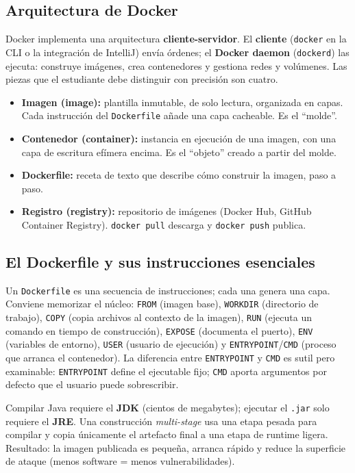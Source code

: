 \documentclass[11pt,a4paper]{article}
\begin{document}
\subsection{Arquitectura de Docker}

Docker implementa una arquitectura \textbf{cliente-servidor}. El \textbf{cliente} (\texttt{docker} en la CLI o la integraci\'on de IntelliJ) env\'ia \'ordenes; el \textbf{Docker daemon} (\texttt{dockerd}) las ejecuta: construye im\'agenes, crea contenedores y gestiona redes y vol\'umenes. Las piezas que el estudiante debe distinguir con precisi\'on son cuatro.

\begin{itemize}
\item \textbf{Imagen (image):} plantilla inmutable, de solo lectura, organizada en capas. Cada instrucci\'on del \texttt{Dockerfile} a\~nade una capa cacheable. Es el ``molde''.
\item \textbf{Contenedor (container):} instancia en ejecuci\'on de una imagen, con una capa de escritura ef\'imera encima. Es el ``objeto'' creado a partir del molde.
\item \textbf{Dockerfile:} receta de texto que describe c\'omo construir la imagen, paso a paso.
\item \textbf{Registro (registry):} repositorio de im\'agenes (Docker Hub, GitHub Container Registry). \texttt{docker pull} descarga y \texttt{docker push} publica.
\end{itemize}

\subsection{El Dockerfile y sus instrucciones esenciales}

Un \texttt{Dockerfile} es una secuencia de instrucciones; cada una genera una capa. Conviene memorizar el n\'ucleo: \texttt{FROM} (imagen base), \texttt{WORKDIR} (directorio de trabajo), \texttt{COPY} (copia archivos al contexto de la imagen), \texttt{RUN} (ejecuta un comando en tiempo de construcci\'on), \texttt{EXPOSE} (documenta el puerto), \texttt{ENV} (variables de entorno), \texttt{USER} (usuario de ejecuci\'on) y \texttt{ENTRYPOINT}/\texttt{CMD} (proceso que arranca el contenedor). La diferencia entre \texttt{ENTRYPOINT} y \texttt{CMD} es sutil pero examinable: \texttt{ENTRYPOINT} define el ejecutable fijo; \texttt{CMD} aporta argumentos por defecto que el usuario puede sobrescribir.

\begin{keybox}
Compilar Java requiere el \textbf{JDK} (cientos de megabytes); ejecutar el \texttt{.jar} solo requiere el \textbf{JRE}. Una construcci\'on \emph{multi-stage} usa una etapa pesada para compilar y copia \'unicamente el artefacto final a una etapa de runtime ligera. Resultado: la imagen publicada es peque\~na, arranca r\'apido y reduce la superficie de ataque (menos software = menos vulnerabilidades).
\end{keybox}
\end{document}
